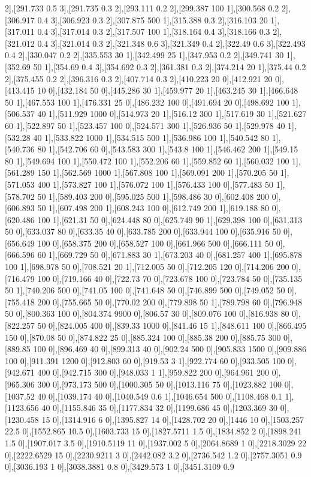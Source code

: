 {2],[291.733 0.5 3],[291.735 0.3 2],[293.111 0.2 2],[299.387 100 1],[300.568 0.2 2],[306.917 0.4 3],[306.923 0.3 2],[307.875 500 1],[315.388 0.3 2],[316.103 20 1],[317.011 0.4 3],[317.014 0.3 2],[317.507 100 1],[318.164 0.4 3],[318.166 0.3 2],[321.012 0.4 3],[321.014 0.3 2],[321.348 0.6 3],[321.349 0.4 2],[322.49 0.6 3],[322.493 0.4 2],[330.047 0.2 2],[335.553 30 1],[342.499 25 1],[347.953 0.2 2],[349.741 30 1],[352.69 50 1],[354.69 0.4 3],[354.692 0.3 2],[361.381 0.3 2],[374.214 20 1],[375.44 0.2 2],[375.455 0.2 2],[396.316 0.3 2],[407.714 0.3 2],[410.223 20 0],[412.921 20 0],[413.415 10 0],[432.184 50 0],[445.286 30 1],[459.977 20 1],[463.245 30 1],[466.648 50 1],[467.553 100 1],[476.331 25 0],[486.232 100 0],[491.694 20 0],[498.692 100 1],[506.537 40 1],[511.929 1000 0],[514.973 20 1],[516.12 300 1],[517.619 30 1],[521.627 60 1],[522.897 50 1],[523.457 100 0],[524.571 300 1],[526.936 50 1],[529.978 40 1],[532.28 40 1],[533.822 1000 1],[534.515 500 1],[536.986 100 1],[540.542 80 1],[540.736 80 1],[542.706 60 0],[543.583 300 1],[543.8 100 1],[546.462 200 1],[549.15 80 1],[549.694 100 1],[550.472 100 1],[552.206 60 1],[559.852 60 1],[560.032 100 1],[561.289 150 1],[562.569 1000 1],[567.808 100 1],[569.091 200 1],[570.205 50 1],[571.053 400 1],[573.827 100 1],[576.072 100 1],[576.433 100 0],[577.483 50 1],[578.702 50 1],[589.403 200 0],[595.025 500 1],[598.486 30 0],[602.408 200 0],[606.893 50 1],[607.498 200 1],[608.243 100 0],[612.749 200 1],[619.188 80 0],[620.486 100 1],[621.31 50 0],[624.448 80 0],[625.749 90 1],[629.398 100 0],[631.313 50 0],[633.037 80 0],[633.35 40 0],[633.785 200 0],[633.944 100 0],[635.916 50 0],[656.649 100 0],[658.375 200 0],[658.527 100 0],[661.966 500 0],[666.111 50 0],[666.596 60 1],[669.729 50 0],[671.883 30 1],[673.203 40 0],[681.257 400 1],[695.878 100 1],[698.978 50 0],[708.521 20 1],[712.005 50 0],[712.205 120 0],[714.206 200 0],[716.479 100 0],[719.166 40 0],[722.73 70 0],[723.678 100 0],[723.784 50 0],[735.135 50 1],[740.206 500 0],[741.05 100 0],[741.648 50 0],[746.899 500 0],[749.052 50 0],[755.418 200 0],[755.665 50 0],[770.02 200 0],[779.898 50 1],[789.798 60 0],[796.948 50 0],[800.363 100 0],[804.374 9900 0],[806.57 30 0],[809.076 100 0],[816.938 80 0],[822.257 50 0],[824.005 400 0],[839.33 1000 0],[841.46 15 1],[848.611 100 0],[866.495 150 0],[870.08 50 0],[874.822 25 0],[885.324 100 0],[885.38 200 0],[885.75 300 0],[889.85 100 0],[896.469 40 0],[899.313 40 0],[902.24 500 0],[905.833 1500 0],[909.886 100 0],[911.391 1200 0],[912.803 60 0],[919.53 3 1],[922.774 60 0],[933.505 100 0],[942.671 400 0],[942.715 300 0],[948.033 1 1],[959.822 200 0],[964.961 200 0],[965.306 300 0],[973.173 500 0],[1000.305 50 0],[1013.116 75 0],[1023.882 100 0],[1037.52 40 0],[1039.174 40 0],[1040.549 0.6 1],[1046.654 500 0],[1108.468 0.1 1],[1123.656 40 0],[1155.846 35 0],[1177.834 32 0],[1199.686 45 0],[1203.369 30 0],[1230.458 15 0],[1314.916 6 0],[1395.827 14 0],[1428.702 20 0],[1446 10 0],[1503.257 22.5 0],[1552.865 10.5 0],[1603.733 15 0],[1827.5711 1.5 0],[1834.852 2 0],[1898.241 1.5 0],[1907.017 3.5 0],[1910.5119 11 0],[1937.002 5 0],[2064.8689 1 0],[2218.3029 22 0],[2222.6529 15 0],[2230.9211 3 0],[2442.082 3.2 0],[2736.542 1.2 0],[2757.3051 0.9 0],[3036.193 1 0],[3038.3881 0.8 0],[3429.573 1 0],[3451.3109 0.9 }
